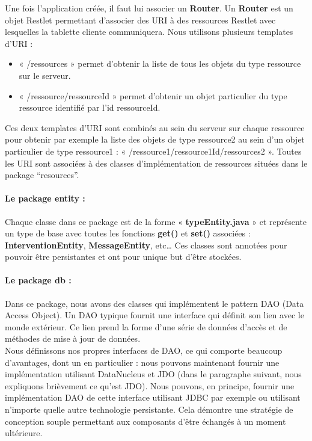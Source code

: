 \documentclass{article}
\begin{document}
Une fois l'application créée, il faut lui associer un \textbf{Router}. Un \textbf{Router} est un objet Restlet permettant d'associer des URI à des ressources Restlet avec lesquelles la tablette cliente communiquera. Nous utilisons plusieurs templates d'URI :
\begin{itemize}
\item « /ressources » permet d'obtenir la liste de tous les objets du type ressource sur le serveur.
\item « /ressource/{ressourceId} »     permet d'obtenir un objet particulier du type ressource identifié par l'id ressourceId.
\end{itemize}
Ces deux templates d'URI sont combinés au sein du serveur sur chaque ressource pour obtenir par exemple la liste des objets de type ressource2 au sein d'un objet particulier de type ressource1 : « /ressource1/{ressource1Id}/ressources2 ».
Toutes les URI sont associées à des classes d'implémentation de ressources situées dans le package “resources”.



\paragraph{Le package entity :}

Chaque classe dans ce package est de la forme « \textbf{typeEntity.java} » et représente un type de base avec toutes les fonctions \textbf{get()} et \textbf{set()} associées : \textbf{InterventionEntity}, \textbf{MessageEntity}, etc… Ces classes sont annotées pour pouvoir être persistantes et ont pour unique but d'être stockées.\\


\paragraph{Le package db :}

Dans ce package, nous avons des classes qui implémentent le pattern DAO (Data Access Object). Un DAO typique fournit une interface qui définit son lien avec le monde extérieur. Ce lien prend la forme d’une série de données d’accès et de méthodes de mise à jour de données.\\


Nous définissons nos propres interfaces de DAO, ce qui comporte beaucoup d’avantages, dont un en particulier : nous pouvons maintenant fournir une implémentation utilisant DataNucleus et JDO (dans le paragraphe suivant, nous expliquons brièvement ce qu’est JDO). Nous pouvons, en principe, fournir une implémentation DAO de cette interface utilisant JDBC par exemple ou utilisant n’importe quelle autre technologie persistante. Cela démontre une stratégie de conception souple permettant aux composants d’être échangés à un moment ultérieure.\\
\end{document}
